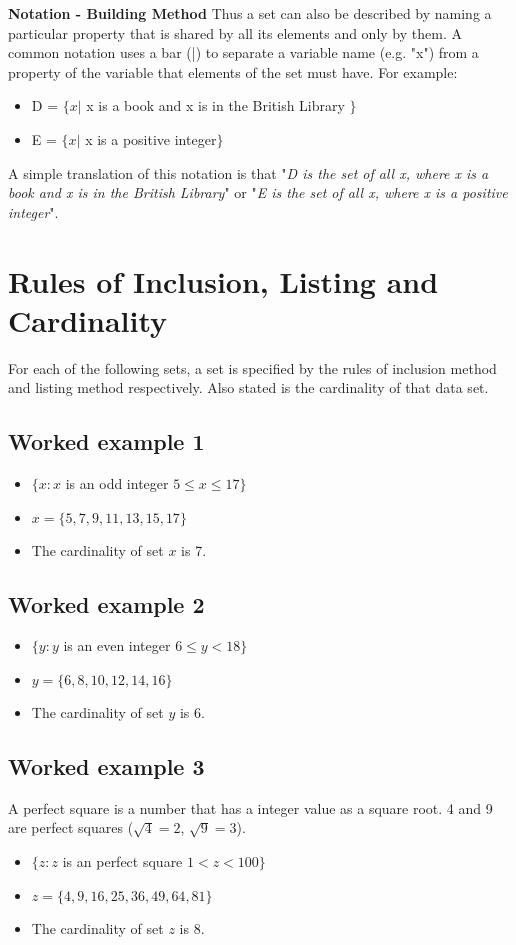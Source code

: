 \documentclass[11pt,a4paper,titlepage,oneside,openany]{article}
\numberwithin{equation}{section}
\numberwithin{algorithm}{section}
\numberwithin{figure}{section}
\numberwithin{table}{section}
\begin{document}
\textbf{Notation - Building Method}
Thus a set can also be described by naming a particular property that is shared by all its elements and only by them. A common notation uses a bar (|) to separate a variable name (e.g. "x") from a property of the variable that elements of the set must have. For example:
\begin{itemize}
\item D = $\{x |$ x is a book and x is in the British Library $\}$
\item E = $\{x |$ x is a positive integer$\}$
\end{itemize}
A simple translation of this notation is that "\textit{D is the set of all x, where x is a book and x is in the British Library}" or "\textit{E is the set of all x, where x is a positive integer}".


\section*{Rules of Inclusion, Listing and Cardinality}
For each of the following sets, a set is specified by the rules of inclusion method and listing method respectively. Also stated is the cardinality of that data set.
\subsection*{Worked example 1}
\begin{itemize}
\item $\{ x : x $ is an odd integer $ 5 \leq x \leq 17 \}$
\item $x = \{5,7,9,11,13,15,17\}$
\item The cardinality of set $x$ is 7.
\end{itemize}

\subsection*{Worked example 2}
\begin{itemize}
\item $\{ y : y $ is an even integer $ 6 \leq y < 18 \}$
\item $y = \{6,8,10,12,14,16\}$
\item The cardinality of set $y$ is 6.
\end{itemize}

\subsection*{Worked example 3}
A perfect square is a number that has a integer value as a
square root. 4 and 9 are perfect squares ($\sqrt{4} = 2$,
$\sqrt{9} = 3$).
\begin{itemize}
\item $\{ z : z $ is an perfect square $ 1 < z < 100 \}$
\item $z = \{4,9,16,25,36,49,64,81\}$
\item The cardinality of set $z$ is 8.
\end{itemize}
\end{document}
